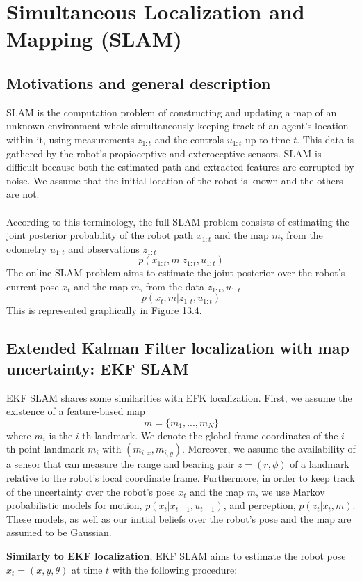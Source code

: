 
\section{Simultaneous Localization and Mapping (SLAM)}
\subsection{Motivations and general description}
SLAM is the computation problem of constructing and updating a map of an unknown environment whole simultaneously keeping track of an agent's location within it, using measurements $z_{1:t}$ and the controls $u_{1:t}$ up to time $t$. This data is gathered by the robot's propioceptive and exteroceptive sensors. SLAM is difficult because both the estimated path and extracted features are corrupted by noise. We assume that the initial location of the robot is known and the others are not.\\ \\
According to this terminology, the full SLAM problem consists of estimating the joint posterior probability of the robot path $x_{1:t}$ and the map $m$, from the odometry $u_{1:t}$ and observations $z_{1:t}$
$$p(x_{1:t}, m|z_{1:t}, u_{1:t})$$
The online SLAM problem aims to estimate the joint posterior over the robot's current pose $x_t$ and the map $m$, from the data $z_{1:t}, u_{1:t}$
$$p(x_t, m|z_{1:t}, u_{1:t})$$
This is represented graphically in Figure 13.4.

\subsection{Extended Kalman Filter localization with map uncertainty: EKF SLAM}
EKF SLAM shares some similarities with EFK localization. First, we assume the existence of a feature-based map
$$m = \{m_1,...,m_N\}$$
where $m_i$ is the $i$-th landmark. We denote the global frame coordinates of the $i$-th point landmark $m_i$ with $(m_{i,x}, m_{i,y})$. Moreover, we assume the availability of a sensor that can measure the range and bearing pair $z = (r, \phi)$ of a landmark relative to the robot's local coordinate frame. Furthermore, in order to keep track of the uncertainty over the robot's pose $x_t$ and the map $m$, we use Markov probabilistic models for motion, $p(x_t|x_{t-1}, u_{t-1})$, and perception, $p(z_t|x_t,m)$. These models, as well as our initial beliefs over the robot's pose and the map are assumed to be Gaussian.

\textbf{Similarly to EKF localization}, EKF SLAM aims to estimate the robot pose $x_t = (x, y, \theta)$ at time $t$ with the following procedure:


